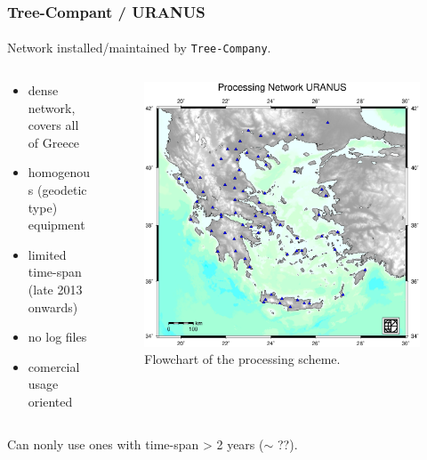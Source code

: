 \documentclass{beamer}
\begin{document}
\begin{frame}\frametitle{Tree-Compant / URANUS}\framesubtitle{}
  Network installed/maintained by \texttt{Tree-Company}\footnotemark.
\begin{columns}[T] %
\begin{column}{.48\textwidth}
  \begin{itemize}
    \item<pro@1-> dense network, covers all of Greece
    \item<pro@1-> homogenous (geodetic type) equipment
    \item<con@1-> limited time-span (late 2013 onwards)
    \item<con@1-> no log files
    \item<con@1-> comercial usage oriented
  \end{itemize}
\end{column}%
\hfill%
\begin{column}{.68\textwidth}
 \begin{figure}
 \begin{center}
 \includegraphics[width=.5\textwidth]{img/uranusnet.eps}
 \caption{Flowchart of the processing scheme.}
 \label{fig:dgrm}
 \end{center}
 \end{figure}
\end{column}%
\end{columns}
  \begin{block}{}
  Can nonly use ones with time-span > 2 years ($\sim$ ??). 
  \end{block}
\end{frame}
\end{document}
